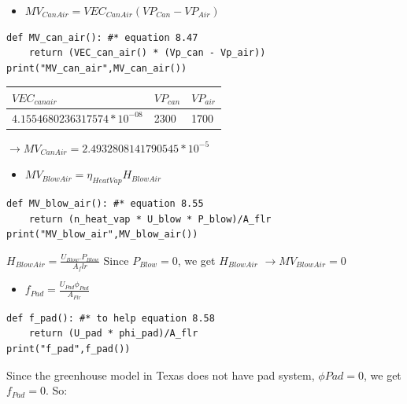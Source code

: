 \documentclass[a4paper]{article}
\numberwithin{equation}{section}
\begin{document}
\begin{itemize}
    \item $ MV_{CanAir} = VEC_{CanAir}(VP_{Can} - VP_{Air})$
\end{itemize}
\begin{mdframed}[leftline=false,rightline=false,backgroundcolor=cyan!10]
  \begin{verbatim}
def MV_can_air(): #* equation 8.47
    return (VEC_can_air() * (Vp_can - Vp_air))
print("MV_can_air",MV_can_air())
\end{verbatim}
\end{mdframed}
\begin{table}[H]
\centering
\begin{tabular}{|l|l|l|}
\hline
\rowcolor[HTML]{FFFC9E} 
\textbf{$VEC_{canair}$} & \textbf{$VP_{can}$} & \cellcolor[HTML]{FFFC9E}\textbf{$VP_{air}$}\\ \hline
$4.1554680236317574*10^{-08}$            & 2300               &  1700                 \\ \hline
\end{tabular}
\end{table}
$\rightarrow MV_{CanAir} = 2.4932808141790545*10^{-5}$

\begin{itemize}
    \item $ MV_{BlowAir} = \eta_{HeatVap} H_{BlowAir}$
\end{itemize}
\begin{mdframed}[leftline=false,rightline=false,backgroundcolor=cyan!10]
  \begin{verbatim}
def MV_blow_air(): #* equation 8.55
    return (n_heat_vap * U_blow * P_blow)/A_flr
print("MV_blow_air",MV_blow_air())
\end{verbatim}
\end{mdframed}
$H_{BlowAir} = \frac{U_{Blow}.P_{Blow}}{A_flr}$
Since $P_{Blow} = 0$, we get $H_{BlowAir}$
$\rightarrow MV_{BlowAir} = 0$

\begin{itemize}
    \item $ f_{Pad} = \frac{U_{Pad} \phi_{Pad}}{A_{Flr}}$
\end{itemize}
\begin{mdframed}[leftline=false,rightline=false,backgroundcolor=cyan!10]
  \begin{verbatim}
def f_pad(): #* to help equation 8.58
    return (U_pad * phi_pad)/A_flr
print("f_pad",f_pad())
\end{verbatim}
\end{mdframed}
Since the greenhouse model in Texas does not have pad system, $\phi Pad = 0$, we get $f_{Pad} = 0$. So:
\end{document}
